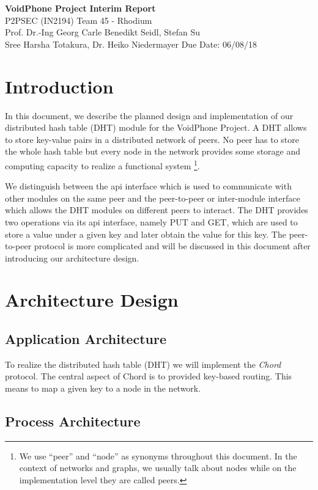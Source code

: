 \documentclass[a4paper, 11pt]{article}
\begin{document}
\noindent
\large\textbf{VoidPhone Project} \hfill \textbf{Interim Report}\\
\normalsize P2PSEC (IN2194)  \hfill Team 45 - Rhodium\\
Prof. Dr.-Ing Georg Carle \hfill Benedikt Seidl, Stefan Su\\
Sree Harsha Totakura, Dr. Heiko Niedermayer \hfill Due Date: 06/08/18

\section*{Introduction}

In this document, we describe the planned design and implementation of our distributed hash table (DHT) module for the VoidPhone Project. A DHT allows to store key-value pairs in a distributed network of peers. No peer has to store the whole hash table but every node in the network provides some storage and computing capacity to realize a functional system \footnote{We use ``peer'' and ``node'' as synonyms throughout this document. In the context of networks and graphs, we usually talk about nodes while on the implementation level they are called peers.}.

We distinguish between the api interface which is used to communicate with other modules on the same peer and the peer-to-peer or inter-module interface which allows the DHT modules on different peers to interact. The DHT provides two operations via its api interface, namely PUT and GET, which are used to store a value under a given key and later obtain the value for this key. The peer-to-peer protocol is more complicated and will be discussed in this document after introducing our architecture design.

\section*{Architecture Design}

\subsection*{Application Architecture}

To realize the distributed hash table (DHT) we will implement the \textit{Chord} protocol. The central aspect of Chord is to provided key-based routing. This means to map a given key to a node in the network.

\subsection*{Process Architecture}
\end{document}
